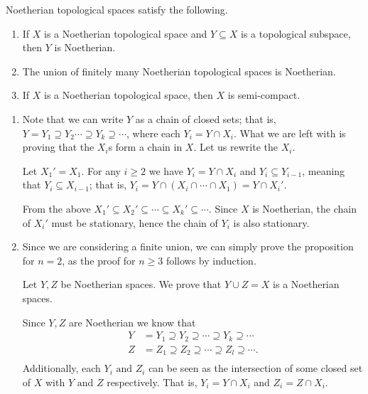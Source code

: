 \documentclass{subfiles}
\begin{document}
    \begin{proposition*}
        Noetherian topological spaces satisfy the following.
        \begin{enumerate}
            \item If \(X\) is a Noetherian topological space and \(Y \subseteq X\) 
                is a topological subspace, then \(Y\) is Noetherian.

            \item The union of finitely many Noetherian topological spaces is Noetherian.
            \item If \(X\) is a Noetherian topological space, then \(X\) is semi-compact.
        \end{enumerate}
    \end{proposition*}

    \begin{proof*}
        \begin{enumerate}
            \item Note that we can write \(Y\) as a chain of closed sets; that is,
                \(Y = Y_{1} \supseteq Y_{2} \cdots \supseteq Y_{k} \supseteq \cdots\),
                where each \(Y_{i} = Y \cap X_{i}\). What we are left with is proving that the 
                \(X_{i}\)s form a chain in \(X\). Let us rewrite the \(X_{i}\).

                Let \(X_{1}' = X_{1}\). For any \(i \ge 2\) we have \(Y_{i} = Y \cap X_{i}\)
                and \(Y_{i} \subseteq Y_{i - 1}\), meaning that \(Y_{i} \subseteq X_{i - 1}\);
                that is, \(Y_{i} = Y \cap (X_{i} \cap \cdots \cap X_{1}) = Y \cap X_{i}'\).

                From the above \(X_{1}' \subseteq X_{2}' \subseteq \cdots \subseteq X_{k}' \subseteq \cdots\).
                Since \(X\) is Noetherian, the chain of \(X_{i}'\) must be stationary,
                hence the chain of \(Y_{i}\) is also stationary.

            \item Since we are considering a finite union, we can simply prove the 
                proposition for \(n = 2\), as the proof for \(n \ge 3\) follows by induction.

                Let \(Y, Z\) be Noetherian spaces. We prove that \(Y \cup Z = X\) is a Noetherian
                    spaces. 

                Since \(Y, Z\) are Noetherian we know that 
                \[\begin{aligned}
                    Y & = Y_{1} \supseteq Y_{2} \supseteq \cdots \supseteq Y_{k} \supseteq \cdots \\ 
                    Z & = Z_{1} \supseteq Z_{2} \supseteq \cdots \supseteq Z_{l} \supseteq \cdots. \\ 
                \end{aligned}\]
                Additionally, each \(Y_{i} \text{ and } Z_{i}\) can be seen as the intersection of some 
                    closed set of \(X\) with \(Y \text{ and } Z\) respectively.
                    That is, \(Y_{i} = Y \cap X_{i}\) and \(Z_{i} = Z \cap X_{i}\).


\end{enumerate}
\end{proof*}
\end{document}
